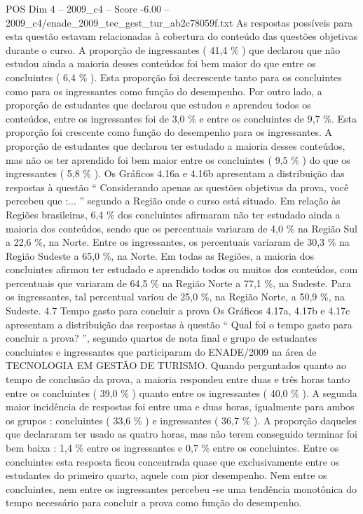 \begin{textsample}{POS Dim 4 – 2009\_c4 – Score -6.00 – 2009\_c4/enade\_2009\_tec\_gest\_tur\_ab2c78059f.txt}
As respostas possíveis para esta questão estavam relacionadas à cobertura do conteúdo das questões objetivas durante o curso.
A proporção de ingressantes ( 41,4 \% ) que declarou que não estudou ainda a maioria desses conteúdos foi bem maior do que entre os concluintes ( 6,4 \% ).
Esta proporção foi decrescente tanto para os concluintes como para os ingressantes como função do desempenho.
Por outro lado, a proporção de estudantes que declarou que estudou e aprendeu todos os conteúdos, entre os ingressantes foi de 3,0 \% e entre os concluintes de 9,7 \%.
Esta proporção foi crescente como função do desempenho para os ingressantes.
A proporção de estudantes que declarou ter estudado a maioria desses conteúdos, mas não os ter aprendido foi bem maior entre os concluintes ( 9,5 \% ) do que os ingressantes ( 5,8 \% ).
Os Gráficos 4.16a e 4.16b apresentam a distribuição das respostas à questão “ Considerando apenas as questões objetivas da prova, você percebeu que :... ” segundo a Região onde o curso está situado.
Em relação às Regiões brasileiras, 6,4 \% dos concluintes afirmaram não ter estudado ainda a maioria dos conteúdos, sendo que os percentuais variaram de 4,0 \% na Região Sul a 22,6 \%, na Norte.
Entre os ingressantes, os percentuais variaram de 30,3 \% na Região Sudeste a 65,0 \%, na Norte.
Em todas as Regiões, a maioria dos concluintes afirmou ter estudado e aprendido todos ou muitos dos conteúdos, com percentuais que variaram de 64,5 \% na Região Norte a 77,1 \%, na Sudeste.
Para os ingressantes, tal percentual variou de 25,0 \%, na Região Norte, a 50,9 \%, na Sudeste. 4.7 Tempo gasto para concluir a prova Os Gráficos 4.17a, 4.17b e 4.17c apresentam a distribuição das respostas à questão “ Qual foi o tempo gasto para concluir a prova? ”, segundo quartos de nota final e grupo de estudantes concluintes e ingressantes que participaram do ENADE/2009 na área de TECNOLOGIA EM GESTÃO DE TURISMO.
Quando perguntados quanto ao tempo de conclusão da prova, a maioria respondeu entre duas e três horas tanto entre os concluintes ( 39,0 \% ) quanto entre os ingressantes ( 40,0 \% ).
A segunda maior incidência de respostas foi entre uma e duas horas, igualmente para ambos os grupos : concluintes ( 33,6 \% ) e ingressantes ( 36,7 \% ).
A proporção daqueles que declararam ter usado as quatro horas, mas não terem conseguido terminar foi bem baixa : 1,4 \% entre os ingressantes e 0,7 \% entre os concluintes.
Entre os concluintes esta resposta ficou concentrada quase que exclusivamente entre os estudantes do primeiro quarto, aquele com pior desempenho.
Nem entre os concluintes, nem entre os ingressantes percebeu -se uma tendência monotônica do tempo necessário para concluir a prova como função do desempenho.

\end{textsample}
